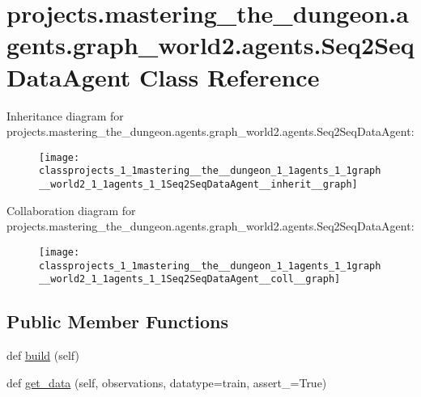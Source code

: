\hypertarget{classprojects_1_1mastering__the__dungeon_1_1agents_1_1graph__world2_1_1agents_1_1Seq2SeqDataAgent}{}\section{projects.\+mastering\+\_\+the\+\_\+dungeon.\+agents.\+graph\+\_\+world2.\+agents.\+Seq2\+Seq\+Data\+Agent Class Reference}
\label{classprojects_1_1mastering__the__dungeon_1_1agents_1_1graph__world2_1_1agents_1_1Seq2SeqDataAgent}


Inheritance diagram for projects.\+mastering\+\_\+the\+\_\+dungeon.\+agents.\+graph\+\_\+world2.\+agents.\+Seq2\+Seq\+Data\+Agent\+:
\nopagebreak
\begin{figure}[H]
\begin{center}
\leavevmode
\texttt{[image: classprojects\_1\_1mastering\_\_the\_\_dungeon\_1\_1agents\_1\_1graph\_\_world2\_1\_1agents\_1\_1Seq2SeqDataAgent\_\_inherit\_\_graph]}
\end{center}
\end{figure}


Collaboration diagram for projects.\+mastering\+\_\+the\+\_\+dungeon.\+agents.\+graph\+\_\+world2.\+agents.\+Seq2\+Seq\+Data\+Agent\+:
\nopagebreak
\begin{figure}[H]
\begin{center}
\leavevmode
\texttt{[image: classprojects\_1\_1mastering\_\_the\_\_dungeon\_1\_1agents\_1\_1graph\_\_world2\_1\_1agents\_1\_1Seq2SeqDataAgent\_\_coll\_\_graph]}
\end{center}
\end{figure}
\subsection*{Public Member Functions}
\begin{DoxyCompactItemize}
\item 
def \hyperlink{classprojects_1_1mastering__the__dungeon_1_1agents_1_1graph__world2_1_1agents_1_1Seq2SeqDataAgent_afe1b45c585513c89e5b20888a32f54fd}{build} (self)
\item 
def \hyperlink{classprojects_1_1mastering__the__dungeon_1_1agents_1_1graph__world2_1_1agents_1_1Seq2SeqDataAgent_aa7bf3db7ca3b36cb8b67b2341a3ce676}{get\+\_\+data} (self, observations, datatype=\textquotesingle{}train\textquotesingle{}, assert\+\_\+=True)
\end{DoxyCompactItemize}
